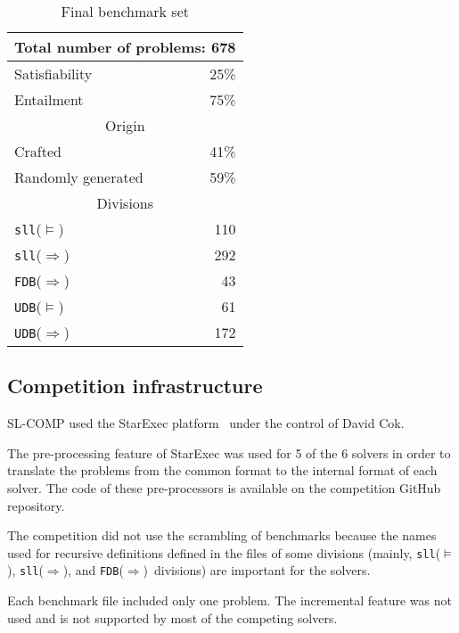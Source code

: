 \documentclass[twoside,11pt]{article}
\newcommand{\limp}{\Rightarrow}
\newcommand{\sllsat}{\texttt{sll}($\models$)}
\newcommand{\sllent}{\texttt{sll}($\limp$)}
\newcommand{\FDBent}{\texttt{FDB}($\limp$)}
\newcommand{\UDBsat}{\texttt{UDB}($\models$)}
\newcommand{\UDBent}{\texttt{UDB}($\limp$)}
\begin{document}
\begin{table}
\begin{center}
\begin{tabular}{p{6cm}r}\hline
\multicolumn{2}{c}{Total number of problems: 678} \\
\hline
Satisfiability & 25\% \\
Entailment & 75\% \\
\hline
%
\hline
\multicolumn{2}{c}{Origin} \\
\hline
Crafted & 41\% \\
Randomly generated & 59\% \\
\hline
%
\hline
\multicolumn{2}{c}{Divisions} \\
\hline
\sllsat & 110 \\ %
\sllent & 292 \\ %
\FDBent &  43 \\ %
\UDBsat &  61 \\ %
\UDBent & 172 \\
\hline
\end{tabular}
\end{center}
\caption{Final benchmark set}
\label{tab:bench}
\end{table}



\subsection{Competition infrastructure}

SL-COMP used the StarExec platform~\cite{StarExecsite} under the control of David Cok. 

The pre-processing feature of StarExec was used for 5 of the 6 solvers in order to translate the problems from the common format to the internal format of each solver. The code of these pre-processors is available on the competition GitHub repository.

The competition did not use the scrambling of benchmarks because the names used for recursive definitions defined in the files of some divisions (mainly, \sllsat, \sllent, and \FDBent\ divisions) are important for the solvers.

Each benchmark file included only one problem. 
The incremental feature was not used and is not supported by most of the competing solvers.
\end{document}
